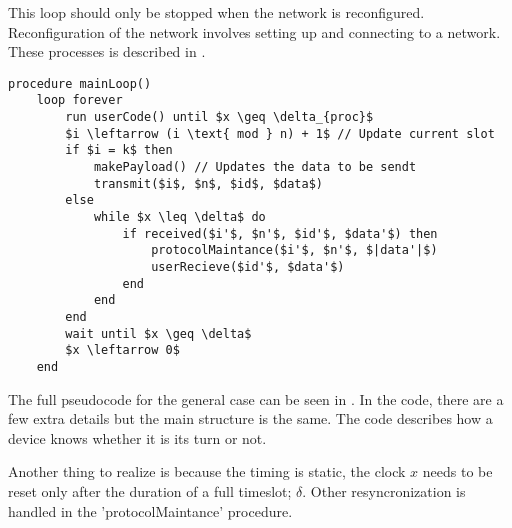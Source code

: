 
This loop should only be stopped when the network is reconfigured. 
Reconfiguration of the network involves setting up and connecting to a network. 
These processes is described in .

\begin{lstlisting}[style=pseudocode,mathescape=true,float,floatplacement=H,
    label={lst:general_case}, caption={Pseudocode example of the main loop}] 
procedure mainLoop()
	loop forever
		run userCode() until $x \geq \delta_{proc}$
		$i \leftarrow (i \text{ mod } n) + 1$ // Update current slot
		if $i = k$ then
			makePayload() // Updates the data to be sendt
			transmit($i$, $n$, $id$, $data$)
		else
			while $x \leq \delta$ do
				if received($i'$, $n'$, $id'$, $data'$) then
					protocolMaintance($i'$, $n'$, $|data'|$)
					userRecieve($id'$, $data'$)
				end
			end
		end
		wait until $x \geq \delta$
		$x \leftarrow 0$ 
	end
\end{lstlisting}  

The full pseudocode for the general case can be seen in . 
In the code, there are a few extra details but the main structure is the same. 
The code describes how a device knows whether it is its turn or not.  

Another thing to realize is because the timing is static, the clock $x$ needs to be reset only after the duration of a full timeslot; $\delta$.
Other resyncronization is handled in the 'protocolMaintance' procedure.
            
